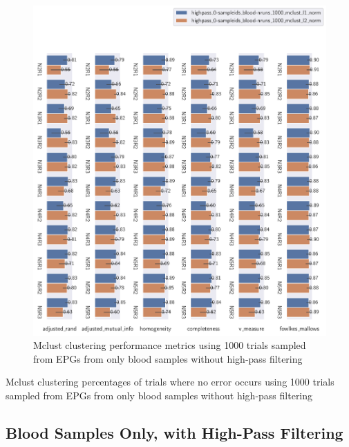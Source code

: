 \begin{theappendices}
\begin{figure}[H]
\centering
\includegraphics[width=\textwidth]{./figures/clust_comparison/highpass_0-sampleids_blood-nruns_1000_mclust.pdf}
\caption{Mclust clustering performance metrics using 1000 trials sampled from EPGs from only blood samples without high-pass filtering}
\label{fig:highpass_0-sampleids_blood-nruns_1000_mclust}
\end{figure}

\begin{table}[H]
\centering
{}
\caption{Mclust clustering percentages of trials where no error occurs using 1000 trials sampled from EPGs from only blood samples without high-pass filtering}
\label{table:highpass_0-sampleids_blood-nruns_1000_mclust}
\end{table}

\subsection{Blood Samples Only, with High-Pass Filtering}


\end{theappendices}
